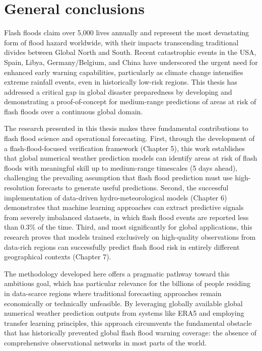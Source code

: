 \chapter{General conclusions}
\label{general_conclusions}
\graphicspath{{chapter_09/figures}{chapter_09/tables}}

Flash floods claim over 5,000 lives annually and represent the most devastating form of flood hazard worldwide, with their impacts transcending traditional divides between Global North and South. Recent catastrophic events in the USA, Spain, Libya, Germany/Belgium, and China have underscored the urgent need for enhanced early warning capabilities, particularly as climate change intensifies extreme rainfall events, even in historically low-risk regions. This thesis has addressed a critical gap in global disaster preparedness by developing and demonstrating a proof-of-concept for medium-range predictions of areas at risk of flash floods over a continuous global domain. 

The research presented in this thesis makes three fundamental contributions to flash flood science and operational forecasting. First, through the development of a flash-flood-focused verification framework (Chapter 5), this work establishes that global numerical weather prediction models can identify areas at risk of flash floods with meaningful skill up to medium-range timescales (5 days ahead), challenging the prevailing assumption that flash flood prediction must use high-resolution forecasts to generate useful predictions. Second, the successful implementation of data-driven hydro-meteorological models (Chapter 6) demonstrates that machine learning approaches can extract predictive signals from severely imbalanced datasets, in which flash flood events are reported less than 0.3\% of the time. Third, and most significantly for global applications, this research proves that models trained exclusively on high-quality observations from data-rich regions can successfully predict flash flood risk in entirely different geographical contexts (Chapter 7).

The methodology developed here offers a pragmatic pathway toward this ambitious goal, which has particular relevance for the billions of people residing in data-scarce regions where traditional forecasting approaches remain economically or technically unfeasible. By leveraging globally available global numerical weather prediction outputs from systems like ERA5 and employing transfer learning principles, this approach circumvents the fundamental obstacle that has historically prevented global flash flood warning coverage: the absence of comprehensive observational networks in most parts of the world.

